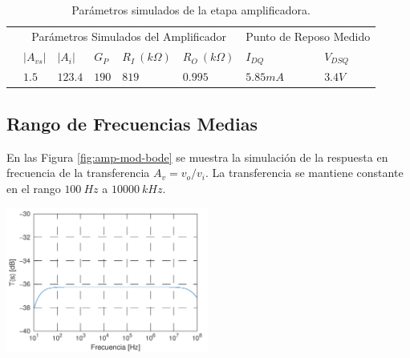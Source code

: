 \documentclass[a4paper, 10pt, spanish]{article}
\begin{document}
\begin{table}[h]
\centering
\begin{tabularx}{0.9\textwidth}{XXXXXXXX}
\hline
\multicolumn{1}{c}{}        & \multicolumn{5}{c}{Parámetros Simulados del Amplificador}           & \multicolumn{2}{c}{Punto de Reposo Medido} \\
                  \cmidrule(r){2-6}                           \cmidrule(r){7-8}
\multicolumn{1}{c}{}        & $|A_{vs}|$      & $|A_{i}|$     & $G_P$       & $R_I\ (k\Omega)$ & $R_O\ (k\Omega)$     & $I_{DQ}$      & $V_{DSQ}$     \\
                  \cmidrule(r){2-2} \cmidrule(r){3-3} \cmidrule(r){4-4}   \cmidrule(r){5-5}   \cmidrule(r){6-6} \cmidrule(r){7-7}   \cmidrule(r){8-8}
\multicolumn{1}{c}{}        & $1.5$ & $123.4$ & $190$ & $819$ & $0.995$ & $5.85mA$& $3.4V$\\
\hline
\end{tabularx}
\caption{Parámetros simulados de la etapa amplificadora.}
\label{tab:simulaciones}
\end{table}




\subsection{Rango de Frecuencias Medias}

En las Figura \ref{fig:amp-mod-bode} se muestra la simulación de la respuesta en frecuencia de la transferencia $A_v = v_o/v_i$. La transferencia se mantiene constante en el rango $100\ Hz$ a $10000\ kHz$.

\begin{center}
  \includegraphics[width=0.5\textwidth]{bode-a-mod.png}
  \label{fig:amp-mod-bode}
\end{center}

\end{document}
